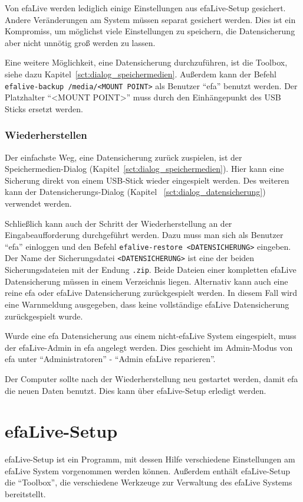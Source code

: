 \documentclass[a4paper,12pt,twoside]{article}
\begin{document}
Von efaLive werden lediglich einige Einstellungen aus efaLive-Setup
gesichert. Andere Veränderungen am System müssen separat gesichert
werden. Dies ist ein Kompromiss, um möglichst viele Einstellungen zu
speichern, die Datensicherung aber nicht unnötig groß werden zu lassen.

Eine weitere Möglichkeit, eine Datensicherung durchzuführen, ist die
Toolbox, siehe dazu Kapitel~\ref{sct:dialog_speichermedien}. Außerdem kann der Befehl
\texttt{efalive-backup /media/{\textless}MOUNT POINT{\textgreater}} 
als Benutzer "`efa"' benutzt werden. Der Platzhalter "`{\textless}MOUNT 
POINT{\textgreater}"' muss durch den Einhängepunkt des USB Sticks 
ersetzt werden.


\subsubsection{Wiederherstellen}
\label{sct:daten_wiederherstellen}
Der einfachste Weg, eine Datensicherung zurück zuspielen, ist der
Speichermedien-Dialog (Kapitel~\ref{sct:dialog_speichermedien}). Hier
kann eine Sicherung direkt von einem USB-Stick wieder eingespielt
werden. Des weiteren kann der Datensicherungs-Dialog (Kapitel
~\ref{sct:dialog_datensicherung}) verwendet werden.

Schließlich kann auch der Schritt der Wiederherstellung an der
Eingabeaufforderung durchgeführt werden. Dazu muss man sich als
Benutzer "`efa"' einloggen und den Befehl
\texttt{efalive-restore {\textless}DATENSICHERUNG{\textgreater}} eingeben. Der
Name der Sicherungsdatei \texttt{{\textless}DATENSICHERUNG{\textgreater}} ist
eine der beiden Sicherungsdateien mit der Endung \texttt{.zip}. Beide Dateien
einer kompletten efaLive Datensicherung müssen in einem Verzeichnis liegen. 
Alternativ kann auch eine reine efa oder efaLive Datensicherung zurückgespielt
werden. In diesem Fall wird eine Warnmeldung ausgegeben, dass keine vollständige
efaLive Datensicherung zurückgespielt wurde.

Wurde eine efa Datensicherung aus einem nicht-efaLive System eingespielt, muss
der efaLive-Admin in efa angelegt werden. Dies geschieht im Admin-Modus von efa
unter "`Administratoren"' - "`Admin efaLive reparieren"'.

Der Computer sollte nach der Wiederherstellung neu gestartet werden,
damit efa die neuen Daten benutzt. Dies kann über efaLive-Setup
erledigt werden.


\section{efaLive-Setup}
\label{sct:efalivesetup}
efaLive-Setup ist ein Programm, mit
dessen Hilfe verschiedene Einstellungen am efaLive System vorgenommen
werden können. Außerdem enthält efaLive-Setup die
"`Toolbox"', die verschiedene Werkzeuge zur
Verwaltung des efaLive Systems bereitstellt.
\end{document}
